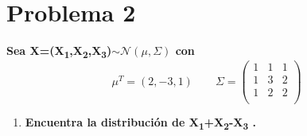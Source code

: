 \section*{Problema 2}

\textbf{Sea X=(X\textsubscript{1},X\textsubscript{2},X\textsubscript{3})$\sim \mathcal{N}(\mu , \Sigma)$ con}
\begin{equation*}
    \mu^T = (2,-3,1) \qquad \Sigma = \begin{pmatrix}
        1 & 1 & 1 \\
        1 & 3 & 2 \\
        1 & 2 & 2 \\
    \end{pmatrix}
\end{equation*}
\begin{enumerate}
    \item \textbf{ Encuentra la distribución de X\textsubscript{1}+X\textsubscript{2}-X\textsubscript{3} .}
\end{enumerate}